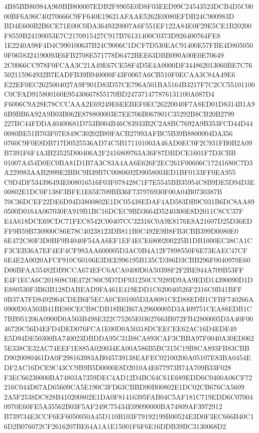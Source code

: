 \documentclass[UTF8,fontset=fandol,zihao=-4,a4paper]{ctexart}
\begin{document}
{{4B85BB86984A969BB800007EDB2F8905E0D8F03EED99C24543523DCB4D5C0000BF6A96C40270666C9FF640E19621AFAAE5262E0080EFDB24C900983D
BD4E600B2B6CE71E00C0DA3649320007A6F551EF122A84E0F29E5CE1B20200F8559B24190053E7C2170915427C917B76131400C0373D926400764FE8
1E2240A98F4D4C990100637B24C9006C1DCF7D530EAC91400E57FBE4D8050500F0658324190093E6FB2708E571778D6472BEE63DBB090A00E0E70649
2C0066CC978F0FCAA3C21A49E67CE58F4D5E4A0000DF344862013060BE7C76502115964932B7EADFB39B940000F43F0067A6CB510F0ECAA3C84A49E6
E22EF0EC2625004027A9F901D83D57CE796A501BA5164B3217F7C2CC55101100C0CFAD915800160E95430667855170BD247371477876131100A087D4
F6006C9A28E78CCCAAA2E69249E6EEBEF0EC26220040F7A8ED01D8314B1A96B9BB6A92A9B03B062E878800003E7EE706B067901C35292B8CB20B2799
227BC44FDDA40400681D753B004B46C83933B2C2A8BC7692A9B353FCD44D440080BE51B703F07E849C30202B89FACB27993AFBC5B39B8800004DA356
0760C9F0E8DB717D0525536AD74C5B171101003A46AD0EC0F2C931FB0B2A09B7391F6F4A3B23525D00406A2F2416809763A36F87DBDCE1601F7D3CBB
01007A454D0EC0BA81D1B7A3C83A4AA6E626F2EC261F00606C17241680C7D3A229983AAB2999E2BBC9B39B7C0080692D9058003ED1BF0133FF0EA955
C9D4DF534396493E008016516F03F078428C1F7E5545BB35954C8B9DE5D94D3E00802E1DC0F138F3BFE1E65E709BB36F737976930F00A04B0730387B
70C36DCEF22DE6D94D3800802E1DC05438EDAF4AD583DB9C031B6DC8AA890500D0164A067030FA919B1BC16DCEC9BD3664D5240300E8D2011C8CC37F
E4A618DCE69CDC71FEC8542C00407CC32316C0A9E8176E8A21607D25D36EDFF9B59B730900C86E78C40238123DB811B0C492E9B8FB3CBB399D0080E0
6E472C80F3D0BF9B4040F54AA6EF1EF4ECE6800200225B1DB1000EC38CA1CF3CEB36A7EF4EF4CF983AA600005D3AC0B4A12F7898550F6E73EAEC47CF
6E4E2A0020AFCF910C60106E3DEE996195B135CD386D3CBB296F0040970E60D06BFAA55482DB9CCA674EFC6ACA0400D0A50398F2F2BE944A709B53FF
E4F1ECA6C201808C0E472C80C9D7DF931250CC9289D9AA9EDD14390090D1DE880530F3B63B128DABEAD9FA461E419EDD1C620040526F2316C0B41BFF
0B37A7FD8492964CDEB6F5ECA6CE01005D3A8081CED88EDB1CFBF740266A0900D0A503B41BE80CECB8CDB18BEB67A29600005D3A409751CEA88EDB1C
7BB951206A0900D0A503B498E322C75265E03627663B072FB42800005D3A40F0046720C56D4EFD4DED076FCA1E00D0A50318DCEECEE62AC16D4EDE49
E5D94DE50300BA740023DBDDA95C31B8CA893CAF3CBBA97F0040A30ED0625E338CE32AC74EEF1E885A020034EA00A586B5BC315C19B8CA893FB83CBB
D9020080461DA0F298163983AB045739138EAFEC02100200A05107E83BA0454EDF2AC16DCE9C43CC9B9B5D0000E8D2010A4E677973B74A709B33F028
F3EC66230000BA74803A7359DEC4AD12D4BC64C61E689EDD6C0400A06CF72216C044D67AD65609CA5E190C3FD63CBBD90B00802E1DC02CB676CA5609
2A5F2538DC828B410200802E1DA0F81416395FAB04C5AF181C719EDD6C070040970E60FE5A35562B03F5AF249C75434E09090000BA74809AF3972912
B739734E3CCF6EF6050050A45D110B103F79192199B00524E3D0F3EC666B40C16D2B076072CF2616207BE64A1A1E15001F6F6E16DDB39BC3130068D2
}}
\end{document}
